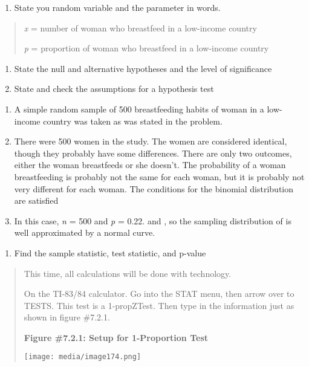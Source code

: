 \documentclass[]{book}
\providecommand{\tightlist}{%
  \setlength{\itemsep}{0pt}\setlength{\parskip}{0pt}}
\begin{document}
\begin{enumerate}
\def\labelenumi{\arabic{enumi}.}
\tightlist
\item
  State you random variable and the parameter in words.
\end{enumerate}

\begin{quote}
\emph{x} = number of woman who breastfeed in a low-income country

\emph{p} = proportion of woman who breastfeed in a low-income country
\end{quote}

\begin{enumerate}
\def\labelenumi{\arabic{enumi}.}
\setcounter{enumi}{1}
\item
  State the null and alternative hypotheses and the level of
  significance
\item
  State and check the assumptions for a hypothesis test
\end{enumerate}

\begin{enumerate}
\def\labelenumi{\alph{enumi}.}
\item
  A simple random sample of 500 breastfeeding habits of woman in a
  low-income country was taken as was stated in the problem.
\item
  There were 500 women in the study. The women are considered
  identical, though they probably have some differences. There are
  only two outcomes, either the woman breastfeeds or she doesn't. The
  probability of a woman breastfeeding is probably not the same for
  each woman, but it is probably not very different for each woman.
  The conditions for the binomial distribution are satisfied
\item
  In this case, \emph{n} = 500 and \emph{p} = 0.22. and , so the sampling
  distribution of is well approximated by a normal curve.
\end{enumerate}

\begin{enumerate}
\def\labelenumi{\arabic{enumi}.}
\setcounter{enumi}{3}
\tightlist
\item
  Find the sample statistic, test statistic, and p-value
\end{enumerate}

\begin{quote}
This time, all calculations will be done with technology.

On the TI-83/84 calculator. Go into the STAT menu, then arrow over to
TESTS. This test is a 1-propZTest. Then type in the information just
as shown in figure \#7.2.1.

\textbf{Figure \#7.2.1: Setup for 1-Proportion Test}

\texttt{[image: media/image174.png]}
\end{quote}
\end{document}
